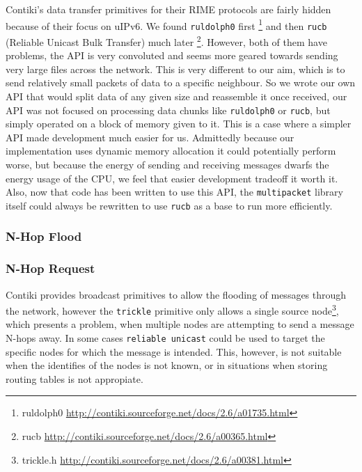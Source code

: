 Contiki's data transfer primitives for their RIME protocols are fairly hidden because of their focus on uIPv6. We found \verb|ruldolph0| first \footnote{ruldolph0 \url{http://contiki.sourceforge.net/docs/2.6/a01735.html}} and then \verb|rucb| (Reliable Unicast Bulk Transfer) much later \footnote{rucb \url{http://contiki.sourceforge.net/docs/2.6/a00365.html}}. However, both of them have problems, the API is very convoluted and seems more geared towards sending very large files across the network. This is very different to our aim, which is to send relatively small packets of data to a specific neighbour. So we wrote our own API that would split data of any given size and reassemble it once received, our API was not focused on processing data chunks like \verb|ruldolph0| or \verb|rucb|, but simply operated on a block of memory given to it. This is a case where a simpler API made development much easier for us. Admittedly because our implementation uses dynamic memory allocation it could potentially perform worse, but because the energy of sending and receiving messages dwarfs the energy usage of the CPU, we feel that easier development tradeoff it worth it. Also, now that code has been written to use this API, the \verb|multipacket| library itself could always be rewritten to use \verb|rucb| as a base to run more efficiently.


\subsubsection{N-Hop Flood}

\subsubsection{N-Hop Request}
Contiki provides broadcast primitives to allow the flooding of messages through the network, however the \verb|trickle|\cite{Levis04trickle} primitive only allows a single source node\footnote{trickle.h \url{http://contiki.sourceforge.net/docs/2.6/a00381.html}}, which presents a problem, when multiple nodes are attempting to send a message N-hops away. 
In some cases \verb|reliable unicast| could be used to target the specific nodes for which the message is intended. This, however, is not suitable when the identifies of the nodes is not known, or in situations when storing routing tables is not appropiate. 


